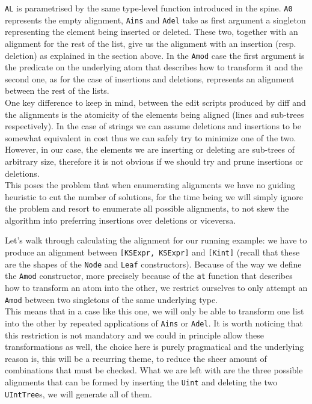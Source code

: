 \documentclass[11pt, titlepage]{article}
\begin{document}
\texttt{AL} is parametrised by the same type-level function introduced in the spine. 
\texttt{A0} represents the empty alignment, \texttt{Ains} and \texttt{Adel} take as first argument
a singleton representing the element being inserted or deleted. These two, together
with an alignment for the rest of the list, give us the alignment with
an insertion (resp. deletion) as explained in the section above. In the
\texttt{Amod} case the first argument is the predicate on the underlying atom that describes how to transform 
it and the second one, as for the case of insertions and deletions, represents an  
alignment between the rest of the lists. 
\\
One key difference to keep in mind, between the edit scripts produced by diff and the alignments is the atomicity of the elements being aligned (lines and sub-trees respectively). In the
case of strings we can assume deletions and insertions to be somewhat
equivalent in cost thus we can safely try to minimize one of the two.
However, in our case, the elements we are inserting or deleting are
sub-trees of arbitrary size, therefore it is not obvious if we should try and prune
insertions or deletions.
\\
This poses the problem that when enumerating alignments we have no guiding heuristic to cut the number
of solutions, for the time being we will simply ignore the problem and resort to enumerate
all possible alignments, to not skew the algorithm into preferring
insertions over deletions or viceversa.

Let's walk through calculating the alignment for our running example: we have to 
produce an alignment between \texttt{[KSExpr, KSExpr]} and \texttt{[Kint]} (recall that these are the shapes of the 
\texttt{Node} and \texttt{Leaf} constructors). Because of the way we 
define the \texttt{Amod} constructor, more precisely because of the \texttt{at} 
function that describes how to transform an atom into the other, we restrict 
ourselves to only attempt an \texttt{Amod} between two singletons of the same underlying type. 
\\
This means that in a case like this one, we will only be able to transform 
one list into the other by repeated applications of \texttt{Ains} or 
\texttt{Adel}. It is worth noticing that this restriction is not mandatory and 
we could in principle allow these transformations as well, the choice here is purely pragmatical and the underlying reason is,
this will be a recurring theme, to reduce the sheer amount of combinations that must be checked.
What we are left with are the three possible alignments that can be formed by inserting the \texttt{Uint} and deleting the two \texttt{UIntTree}s, we will generate all of them. 
\end{document}
